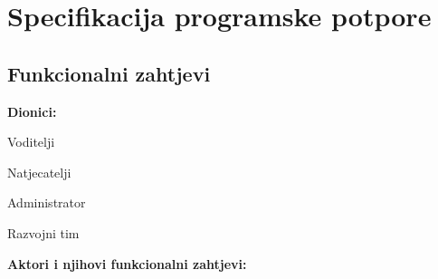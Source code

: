 \chapter{Specifikacija programske potpore}
		
	\section{Funkcionalni zahtjevi}
			
			\noindent \textbf{Dionici:}
			
			\begin{packed_enum}
				
				\item Voditelji
				\item Natjecatelji				
				\item Administrator
				\item Razvojni tim
				
			\end{packed_enum}
			
			\noindent \textbf{Aktori i njihovi funkcionalni zahtjevi:}
			
